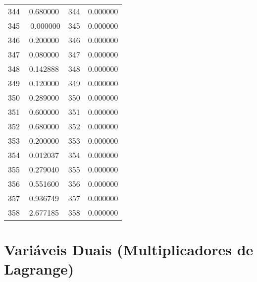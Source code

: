 \documentclass[12pt]{article}
\begin{document}
\begin{longtable}{@{}cccc@{}}
344 & 0.680000 & 344 & 0.000000 \\
345 & -0.000000 & 345 & 0.000000 \\
346 & 0.200000 & 346 & 0.000000 \\
347 & 0.080000 & 347 & 0.000000 \\
348 & 0.142888 & 348 & 0.000000 \\
349 & 0.120000 & 349 & 0.000000 \\
350 & 0.289000 & 350 & 0.000000 \\
351 & 0.600000 & 351 & 0.000000 \\
352 & 0.680000 & 352 & 0.000000 \\
353 & 0.200000 & 353 & 0.000000 \\
354 & 0.012037 & 354 & 0.000000 \\
355 & 0.279040 & 355 & 0.000000 \\
356 & 0.551600 & 356 & 0.000000 \\
357 & 0.936749 & 357 & 0.000000 \\
358 & 2.677185 & 358 & 0.000000 \\

\end{longtable}

\section{Variáveis Duais (Multiplicadores de Lagrange)}
\end{document}
